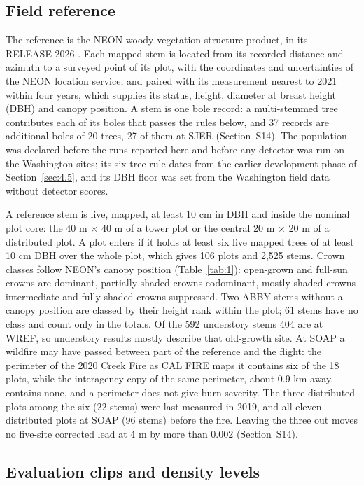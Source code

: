 \documentclass[preprint,12pt,authoryear,a4paper]{elsarticle}
\begin{document}
\subsection{Field reference}\label{sec:3.2}

The reference is the NEON woody vegetation structure product, in its
RELEASE-2026 \citep{neon2026vegetation}. Each mapped stem is located from its
recorded distance and azimuth to a surveyed point of its plot, with the
coordinates and uncertainties of the NEON location service, and paired with its
measurement nearest to 2021 within four years, which supplies its status,
height, diameter at breast height (DBH) and canopy position. A stem is one bole
record: a multi-stemmed tree contributes each of its boles that passes the rules
below, and 37 records are additional boles of 20 trees, 27 of them at SJER
(Section~S14). The population was declared before the runs reported here and
before any detector was run on the Washington sites; its six-tree rule dates
from the earlier development phase of Section~\ref{sec:4.5}, and its DBH floor was set
from the Washington field data without detector scores.

A reference stem is live, mapped, at least 10 cm in DBH and inside the nominal
plot core: the 40 m $\times$ 40 m of a tower plot or the central 20 m $\times$ 20 m of a
distributed plot. A plot enters if it holds at least six live mapped trees of at
least 10 cm DBH over the whole plot, which gives 106 plots and 2,525 stems.
Crown classes follow NEON's canopy position (Table~\ref{tab:1}): open-grown and full-sun
crowns are dominant, partially shaded crowns codominant, mostly shaded crowns
intermediate and fully shaded crowns suppressed. Two ABBY stems without a canopy
position are classed by their height rank within the plot; 61 stems have no
class and count only in the totals. Of the 592 understory stems 404 are at WREF,
so understory results mostly describe that old-growth site. At SOAP a wildfire
may have passed between part of the reference and the flight: the perimeter of
the 2020 Creek Fire as CAL FIRE maps it contains six of the 18 plots, while the
interagency copy of the same perimeter, about 0.9 km away, contains none, and a
perimeter does not give burn severity. The three distributed plots among the six
(22 stems) were last measured in 2019, and all eleven distributed plots at SOAP
(96 stems) before the fire. Leaving the three out moves no five-site corrected
lead at 4 m by more than 0.002 (Section~S14).

\subsection{Evaluation clips and density levels}\label{sec:3.3}
\end{document}
